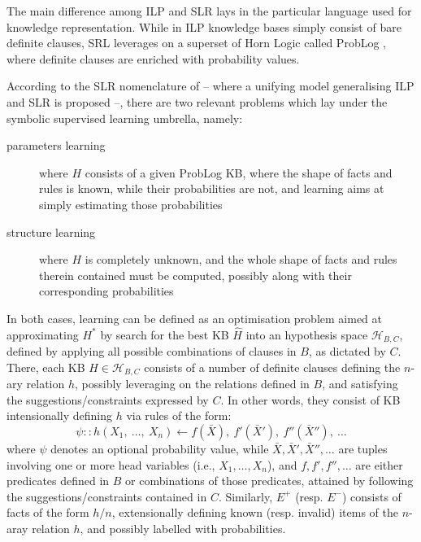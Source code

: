 \documentclass[12pt,a4paper,openright,twoside]{book}
\begin{document}
The main difference among ILP and SLR lays in the particular language used for knowledge representation.
%
While in ILP knowledge bases simply consist of bare definite clauses, SRL leverages on a superset of Horn Logic called ProbLog \cite{RaedtKT07}, where definite clauses are enriched with probability values.

According to the SLR nomenclature of \cite{DeRaedt2010} -- where a unifying model generalising ILP and SLR is proposed --, there are two relevant problems which lay under the symbolic supervised learning umbrella, namely:
%
\begin{description}
    \item[parameters learning] where $H$ consists of a given ProbLog KB, where the shape of facts and rules is known, while their probabilities are not, and learning aims at simply estimating those probabilities

    \item[structure learning] where $H$ is completely unknown, and the whole shape of facts and rules therein contained must be computed, possibly along with their corresponding probabilities
\end{description}

In both cases, learning can be defined as an optimisation problem aimed at approximating $H^*$ by search for the best KB $\hat{H}$ into an hypothesis space $\mathcal{H}_{B,C}$, defined by applying all possible combinations of clauses in $B$, as dictated by $C$.
%
There, each KB $H \in \mathcal{H}_{B,C}$ consists of a number of definite clauses defining the $n$-ary relation $h$, possibly leveraging on the relations defined in $B$, and satisfying the suggestions/constraints expressed by $C$.
%
In other words, they consist of KB intensionally defining $h$ via rules of the form:
%
\begin{equation*}
    \psi :: h(X_1,\ \ldots,\ X_n) \leftarrow f(\bar{X}),\ f'(\bar{X}'),\ f''(\bar{X}''),\ \ldots
\end{equation*}
%
where $\psi$ denotes an optional probability value,  while $\bar{X}, \bar{X}', \bar{X}'', \ldots$ are tuples involving one or more head variables (i.e., $X_1, \ldots, X_n$), and $f, f', f'', \ldots$ are either predicates defined in $B$ or combinations of those predicates, attained by following the suggestions/constraints contained in $C$.
%
Similarly, $E^+$ (resp. $E^-$) consists of facts of the form $h/n$, extensionally defining known (resp. invalid) items of the $n$-aray relation $h$, and possibly labelled with probabilities.
\end{document}
